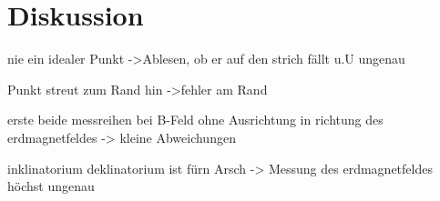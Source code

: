 \section{Diskussion}
\label{sec:Diskussion}

nie ein idealer Punkt
->Ablesen, ob er auf den strich fällt u.U ungenau

Punkt streut zum Rand hin
->fehler am Rand 

erste beide messreihen bei B-Feld ohne Ausrichtung in richtung des erdmagnetfeldes
-> kleine Abweichungen

inklinatorium deklinatorium ist fürn Arsch
-> Messung des erdmagnetfeldes höchst ungenau
